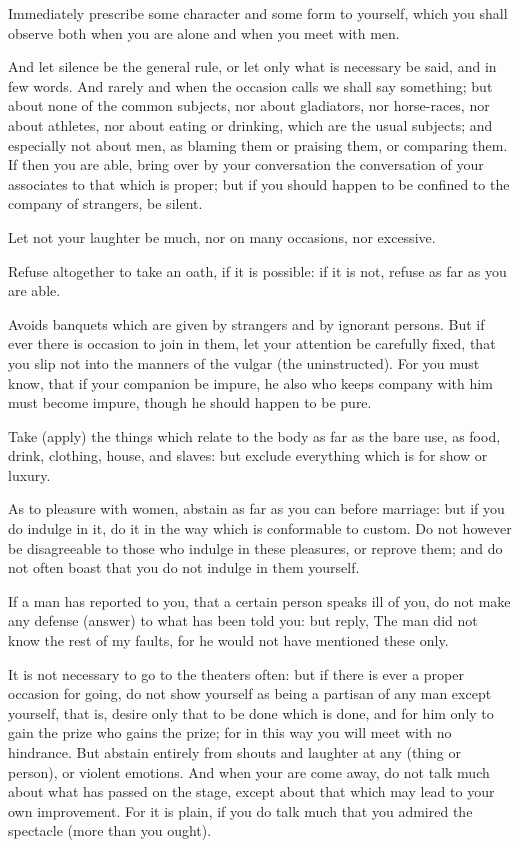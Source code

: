 Immediately prescribe some character and some form to yourself, which you shall
observe both when you are alone and when you meet with men.

And let silence be the general rule, or let only what is necessary be said, and
in few words.  And rarely and when  the occasion calls we  shall say something;
but about none  of the common subjects, nor about  gladiators, nor horse-races,
nor about athletes, nor about eating or drinking, which are the usual subjects;
and especially  not about men, as  blaming them or praising  them, or comparing
them. If then you are able, bring over by your conversation the conversation of
your  associates to  that which  is  proper; but  if  you should  happen to  be
confined to the company of strangers, be silent.

Let not your laughter be much, nor on many occasions, nor excessive.

Refuse altogether to take  an oath, if it is possible: if it  is not, refuse as
far as you are able.

Avoids banquets  which are given by  strangers and by ignorant  persons. But if
ever there is occasion to join in  them, let your attention be carefully fixed,
that you slip  not into the manners  of the vulgar (the  uninstructed). For you
must know, that if your companion be impure, he also who keeps company with him
must become impure, though he should happen to be pure.

Take (apply)  the things which relate  to the body as  far as the bare  use, as
food, drink, clothing,  house, and slaves: but exclude everything  which is for
show or luxury.

As to pleasure  with women, abstain as  far as you can before  marriage: but if
you do indulge in  it, do it in the way which is  conformable to custom. Do not
however be  disagreeable to those  who indulge  in these pleasures,  or reprove
them; and do not often boast that you do not indulge in them yourself.

If a man has  reported to you, that a certain person speaks  ill of you, do not
make any defense (answer) to what has been told you: but reply, The man did not
know the rest of my faults, for he would not have mentioned these only.

It is not necessary to go to the  theaters often: but if there is ever a proper
occasion for going, do not show yourself  as being a partisan of any man except
yourself, that is, desire only that to be  done which is done, and for him only
to gain the  prize who gains the prize;  for in this way you will  meet with no
hindrance.  But abstain  entirely from  shouts and  laughter at  any (thing  or
person), or  violent emotions. And  when your are come  away, do not  talk much
about what has  passed on the stage,  except about that which may  lead to your
own improvement.  For it is  plain, if  you do talk  much that you  admired the
spectacle (more than you ought).

